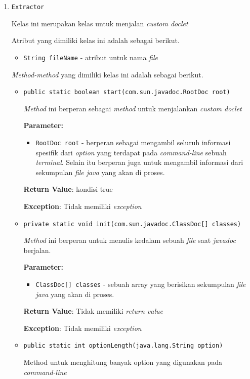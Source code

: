 \begin{enumerate}
\item \texttt{Extractor}

Kelas ini merupakan kelas untuk menjalan \textit{custom doclet}

Atribut yang dimiliki kelas ini adalah sebagai berikut.
\begin{itemize}
\item \texttt{String fileName} - atribut untuk nama \textit{file}
\end{itemize}
\textit{Method-method} yang dimiliki kelas ini adalah sebagai berikut.
\begin{itemize}
\item \texttt{public static boolean start(com.sun.javadoc.RootDoc root)}

\textit{Method} ini berperan sebagai \textit{method} untuk menjalankan
 \textit{custom doclet}

\textbf{Parameter:}
\begin{itemize}
\item \texttt{RootDoc root} - 
berperan sebagai mengambil seluruh informasi spesifik dari
             \textit{option} yang terdapat pada \textit{command-line} sebuah
             \textit{terminal}. Selain itu berperan juga untuk mengambil informasi dari
             sekumpulan \textit{file java} yang akan di proses.
\end{itemize}
\textbf{Return Value}: kondisi true

\textbf{Exception}: Tidak memiliki \textit{exception}

\item \texttt{private static void init(com.sun.javadoc.ClassDoc[] classes)}

\textit{Method} ini berperan untuk menulis kedalam sebuah \textit{file}
 saat \textit{javadoc} berjalan.

\textbf{Parameter:}
\begin{itemize}
\item \texttt{ClassDoc[] classes} - 
sebuah array yang berisikan sekumpulan \textit{file java}
                yang akan di proses.
\end{itemize}
\textbf{Return Value}: Tidak memiliki \textit{return value}

\textbf{Exception}: Tidak memiliki \textit{exception}

\item \texttt{public static int optionLength(java.lang.String option)}

Method untuk menghitung banyak option yang digunakan pada
 \textit{command-line}


\end{itemize}
\end{enumerate}

